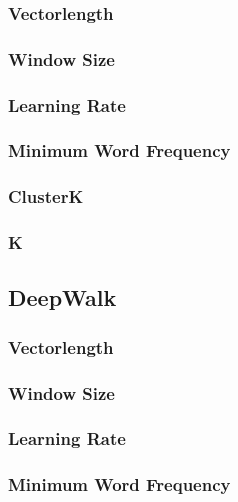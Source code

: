 \subsubsection*{Vectorlength}



\subsubsection*{Window Size}

\subsubsection*{Learning Rate}

\subsubsection*{Minimum Word Frequency}

\subsubsection*{ClusterK}

\subsubsection*{K}

\subsection{DeepWalk}

\subsubsection*{Vectorlength}



\subsubsection*{Window Size}

\subsubsection*{Learning Rate}

\subsubsection*{Minimum Word Frequency}

